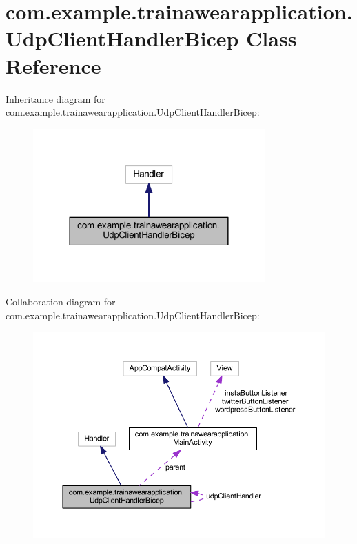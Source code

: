 \hypertarget{classcom_1_1example_1_1trainawearapplication_1_1_udp_client_handler_bicep}{}\section{com.\+example.\+trainawearapplication.\+Udp\+Client\+Handler\+Bicep Class Reference}
\label{classcom_1_1example_1_1trainawearapplication_1_1_udp_client_handler_bicep}


Inheritance diagram for com.\+example.\+trainawearapplication.\+Udp\+Client\+Handler\+Bicep\+:
\nopagebreak
\begin{figure}[H]
\begin{center}
\leavevmode
\includegraphics[width=252pt]{classcom_1_1example_1_1trainawearapplication_1_1_udp_client_handler_bicep__inherit__graph}
\end{center}
\end{figure}


Collaboration diagram for com.\+example.\+trainawearapplication.\+Udp\+Client\+Handler\+Bicep\+:
\nopagebreak
\begin{figure}[H]
\begin{center}
\leavevmode
\includegraphics[width=350pt]{classcom_1_1example_1_1trainawearapplication_1_1_udp_client_handler_bicep__coll__graph}
\end{center}
\end{figure}
